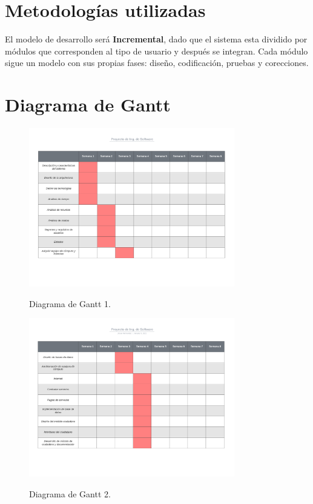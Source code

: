 \documentclass[12pt,twoside]{article}
\begin{document}
\section{Metodologías utilizadas}

El modelo de desarrollo será \textbf{Incremental}, dado que el sistema esta dividido por módulos
que corresponden al tipo de usuario y después se integran. Cada módulo sigue un
modelo con sus propias fases: diseño, codificación, pruebas y corecciones.

\section{Diagrama de Gantt}

\begin{figure}[!htb]
    \centering
    \includegraphics[width=0.8\textwidth]{images/gantt1.png}
    \label{gantt1}
    \caption{Diagrama de Gantt 1.}
\end{figure}

\begin{figure}[!htb]
    \centering
    \includegraphics[width=0.8\textwidth]{images/gantt2.png}
    \label{gantt2}
    \caption{Diagrama de Gantt 2.}
\end{figure}
\end{document}
